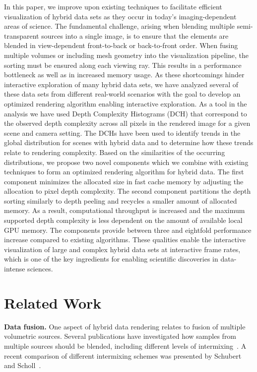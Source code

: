 \documentclass{egpubl}
\newcommand{\dch}{DCH}
\begin{document}
In this paper, we improve upon existing techniques to facilitate efficient visualization of hybrid data sets as they occur in today's imaging-dependent areas of science. 
The fundamental challenge, arising when blending multiple semi-transparent sources into a single image, is to ensure that the elements are blended in view-dependent front-to-back or back-to-front order. 
When fusing multiple volumes or including mesh geometry into the visualization pipeline, the sorting must be ensured along each viewing ray.
This results in a performance bottleneck as well as in increased memory usage. 
As these shortcomings hinder interactive exploration of many hybrid data sets, we have analyzed several of these data sets from different real-world scenarios with the goal to develop an optimized rendering algorithm enabling interactive exploration. 
As a tool in the analysis we have used {Depth Complexity Histograms} (\dch) that correspond to the observed depth complexity across all pixels in the rendered image for a given scene and camera setting. 
The \dch{}s have been used to identify trends in the global distribution for scenes with hybrid data and to determine how these trends relate to rendering complexity. 
Based on the similarities of the occurring distributions, we propose two novel components which we combine with existing techniques to form an optimized rendering algorithm for hybrid data. 
The first component minimizes the allocated size in fast cache memory by adjusting the allocation to pixel depth complexity. 
The second component partitions the depth sorting similarly to depth peeling and recycles a smaller amount of allocated memory. 
As a result, computational throughput is increased and the maximum supported depth complexity is less dependent on the amount of available local GPU memory. 
The components provide between three and eightfold performance increase compared to existing algorithms. 
These qualities enable the interactive visualization of large and complex hybrid data sets at interactive frame rates, which is one of the key ingredients for enabling scientific discoveries in data-intense sciences.



\section{Related Work}
\label{sec:related-work}

\noindent\textbf{Data fusion.} 
%
One aspect of hybrid data rendering relates to fusion of multiple volumetric sources.
Several publications have investigated how samples from multiple sources should be blended, including different levels of intermixing~\cite{cai99intermixing}. 
A recent comparison of different intermixing schemes was presented by Schubert and Scholl~\cite{Schubert2011}. 
\end{document}
